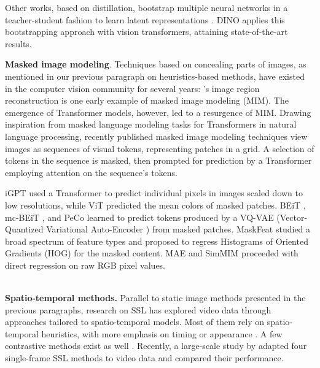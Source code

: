 \documentclass[times,twocolumn,final]{elsarticle}
\begin{document}
Other works, based on distillation, bootstrap multiple neural networks in a teacher-student fashion to learn latent representations \citep{grill2020bootstrap}. DINO \citep{caron2021emerging} applies this bootstrapping approach with vision transformers, attaining state-of-the-art results.
\\
{\color{newtext} \noindent\textbf{Masked image modeling}. Techniques based on concealing parts of images, as mentioned in our previous paragraph on heuristics-based methods, have existed in the computer vision community for several years: \cite{pathak2016context}'s image region reconstruction is one early example of masked image modeling (MIM). The emergence of Transformer models, however, led to a resurgence of MIM. Drawing inspiration from masked language modeling tasks for Transformers in natural language processing, recently published masked image modeling techniques view images as sequences of visual tokens, representing patches in a grid. A selection of tokens in the sequence is masked, then prompted for prediction by a Transformer employing attention on the sequence's tokens.

iGPT \citep{chen2020iGPT} used a Transformer to predict individual pixels in images scaled down to low resolutions, while ViT \citep{dosovitskiy2020ViT} predicted the mean colors of masked patches. BEiT \citep{bao2022beit}, mc-BEiT \citep{li2022mcbeit}, and PeCo \citep{dong2021PeCo} learned to predict tokens produced by a VQ-VAE (Vector-Quantized Variational Auto-Encoder \citep{vq-vae}) from masked patches. MaskFeat \citep{wei2022MaskFeat} studied a broad spectrum of feature types and proposed to regress Histograms of Oriented Gradients (HOG) for the masked content. MAE \citep{he2022MAE} and SimMIM \citep{xie2022simmim} proceeded with direct regression on raw RGB pixel values.}
\\
\noindent\textbf{Spatio-temporal methods.}
Parallel to static image methods presented in the previous paragraphs, research on SSL has explored video data through approaches tailored to spatio-temporal models. Most of them rely on spatio-temporal heuristics, with more emphasis on timing \citep{vssl_shufflelearn, vssl_oddoneout, vssl_sorting, vssl_order, vssl_tcc, vssl_temporaltransform, vssl_speednet} or appearance \citep{vssl_colorization, vssl_jigsaw, vssl_move, vssl_cubic, vssl_dynamonet}. A few contrastive methods exist as well \citep{vssl_contrastive, vssl_videomoco, vssl_cotraining}. Recently, a large-scale study by \cite{vssl_review} adapted four single-frame SSL methods \cite{chen2020simple, he2020momentum, Byol2020, caron2020unsupervised} to video data and compared their performance.
\\
\end{document}
